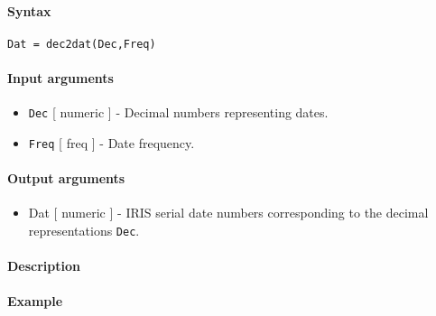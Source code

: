 


	\paragraph{Syntax}

\begin{verbatim}
Dat = dec2dat(Dec,Freq)
\end{verbatim}

\paragraph{Input arguments}

\begin{itemize}
\item
  \texttt{Dec} {[} numeric {]} - Decimal numbers representing dates.
\item
  \texttt{Freq} {[} freq {]} - Date frequency.
\end{itemize}

\paragraph{Output arguments}

\begin{itemize}
\itemsep1pt\parskip0pt
\item
  Dat {[} numeric {]} - IRIS serial date numbers corresponding to the
  decimal representations \texttt{Dec}.
\end{itemize}

\paragraph{Description}

\paragraph{Example}


